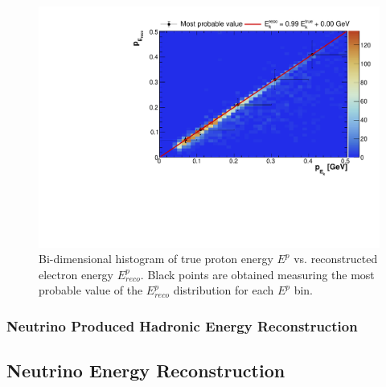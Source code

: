 \begin{figure}[!htbp]
\centering
\includegraphics[width=0.65\columnwidth]{figures/pcalib.pdf}
\caption{Bi-dimensional histogram of true proton energy $E^{p}$ vs. reconstructed electron energy $E_{reco}^{p}$. Black points are obtained measuring the most probable value of the $E_{reco}^{p}$ distribution for each $E^{p}$ bin.}
\label{fig:pcalib}
\end{figure}


\subsubsection{Neutrino Produced Hadronic Energy Reconstruction}

\subsection{Neutrino Energy Reconstruction}